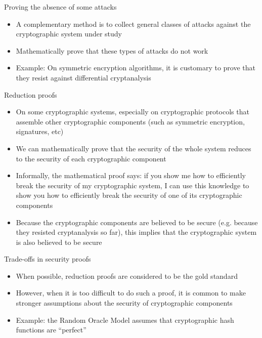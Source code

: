 \documentclass[aspectratio=169, lualatex, handout]{beamer}
\begin{document}
\begin{frame}{Proving the absence of some attacks}
	\begin{itemize}
		\item A complementary method is to collect general classes of attacks against the cryptographic system under study
		\item Mathematically prove that these types of attacks do not work
		\item Example: On symmetric encryption algorithms, it is customary to prove that they resist against differential cryptanalysis
	\end{itemize}
\end{frame}

\begin{frame}{Reduction proofs}
	\begin{itemize}
		\item On some cryptographic systems, especially on cryptographic protocols that assemble other cryptographic components (such as symmetric encryption, signatures, etc)
		\item We can mathematically prove that the security of the whole system reduces to the security of each cryptographic component
		\item Informally, the mathematical proof says: if you show me how to efficiently break the security of my cryptographic system, I can use this knowledge to show you how to efficiently break the security of one of its cryptographic components
		\item Because the cryptographic components are believed to be secure (e.g. because they resisted cryptanalysis so far), this implies that the cryptographic system is also believed to be secure
	\end{itemize}
\end{frame}

\begin{frame}{Trade-offs in security proofs}
	\begin{itemize}
		\item When possible, reduction proofs are considered to be the gold standard
		\item However, when it is too difficult to do such a proof, it is common to make stronger assumptions about the security of cryptographic components
		\item Example: the Random Oracle Model assumes that cryptographic hash functions are ``perfect''
	\end{itemize}
\end{frame}
\end{document}
